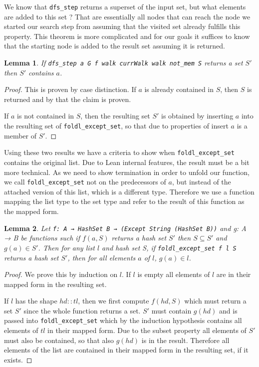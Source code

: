 \documentclass{article}
\newtheorem{lemma}{Lemma}
\begin{document}
        We know that \texttt{dfs\_step} returns a superset of the input set, but what elements are added to this set ? That are essentially all nodes that can reach the node we started our search step from assuming that the visited set already fulfills this property. This theorem is more complicated and for our goals it suffices to know that the starting node is added to the result set assuming it is returned.

        \begin{lemma}
            If \texttt{dfs\_step a G f walk currWalk walk not\_mem S} returns a set $S'$ then $S'$ contains $a$.
        \end{lemma}
        \begin{proof}
            This is proven by case distinction. If $a$ is already contained in $S$, then $S$ is returned and by that the claim is proven.

            If $a$ is not contained in $S$, then the resulting set $S'$ is obtained by inserting $a$ into the resulting set of \texttt{foldl\_except\_set}, so that due to properties of insert $a$ is a member of $S'$.
        \end{proof}
        

        Using these two results we have a criteria to show when \texttt{foldl\_except\_set} contains the original list. Due to Lean internal features, the result must be a bit more technical. As we need to show termination in order to unfold our function, we call \texttt{foldl\_except\_set} not on the predecessors of $a$, but instead of the attached version of this list, which is a different type. Therefore we use a function mapping the list type to the set type and refer to the result of this function as the mapped form.

        \begin{lemma}
            Let \texttt{f: A → HashSet B → (Except String (HashSet B))} and {g: A → B} be functions such if $f(a,S) $ returns a hash set $S'$  then $S \subseteq S'$ and $g(a) \in S'$. Then for any list $l$ and hash set S,  if \texttt{foldl\_except\_set f l S} returns a hash set $S'$, then for all elements $a$ of $l$, $g(a) \in l$.
        \end{lemma}
        \begin{proof}
            We prove this by induction on $l$.
            If $l$ is empty all elements of $l$ are in their mapped form in the resulting set.

            If $l$ has the shape $hd::tl$, then we first compute $f(hd,S)$ which must return a set $S'$ since the whole function returns a set. $S'$ must contain $g(hd)$ and is passed into \texttt{foldl\_except\_set} which by the induction hypothesis contains all elements of $tl$ in their mapped form. Due to the subset property all elements of $S'$ must also be contained, so that also $g(hd)$ is in the result. Therefore all elements of the list are contained in their mapped form in the resulting set, if it exists.
        \end{proof}
\end{document}
